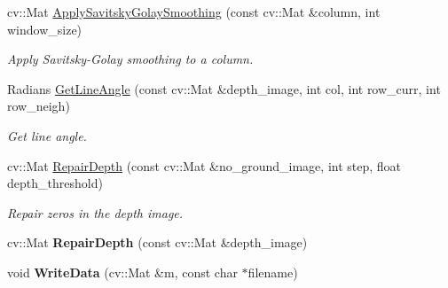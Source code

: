 \begin{DoxyCompactItemize}
\item 
cv\-::\-Mat \hyperlink{classdepth__clustering_1_1DepthGroundRemover_a63b32fa801a13021bf22699525579f8b}{Apply\-Savitsky\-Golay\-Smoothing} (const cv\-::\-Mat \&column, int window\-\_\-size)
\begin{DoxyCompactList}\small\item\em Apply Savitsky-\/\-Golay smoothing to a column. \end{DoxyCompactList}\item 
Radians \hyperlink{classdepth__clustering_1_1DepthGroundRemover_a29ba07a101794aab322ae3c0671806e0}{Get\-Line\-Angle} (const cv\-::\-Mat \&depth\-\_\-image, int col, int row\-\_\-curr, int row\-\_\-neigh)
\begin{DoxyCompactList}\small\item\em Get line angle. \end{DoxyCompactList}\item 
cv\-::\-Mat \hyperlink{classdepth__clustering_1_1DepthGroundRemover_a51dd313ed1bdda2188fb3a3fa1c5738e}{Repair\-Depth} (const cv\-::\-Mat \&no\-\_\-ground\-\_\-image, int step, float depth\-\_\-threshold)
\begin{DoxyCompactList}\small\item\em Repair zeros in the depth image. \end{DoxyCompactList}\item 
\hypertarget{classdepth__clustering_1_1DepthGroundRemover_ab44815e8ea8b10abce24faebf8322624}{cv\-::\-Mat {\bfseries Repair\-Depth} (const cv\-::\-Mat \&depth\-\_\-image)}\label{classdepth__clustering_1_1DepthGroundRemover_ab44815e8ea8b10abce24faebf8322624}

\item 
\hypertarget{classdepth__clustering_1_1DepthGroundRemover_a37cd0a7054c51343f6a25f269890fae2}{void {\bfseries Write\-Data} (cv\-::\-Mat \&m, const char $\ast$filename)}\label{classdepth__clustering_1_1DepthGroundRemover_a37cd0a7054c51343f6a25f269890fae2}

\end{DoxyCompactItemize}
